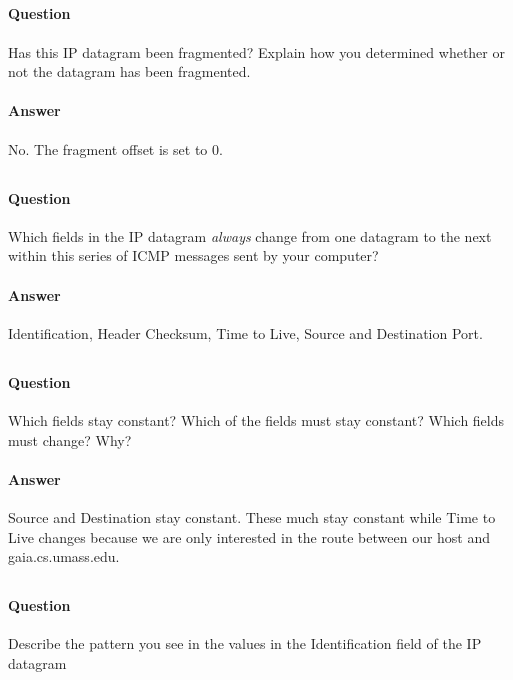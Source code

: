 \documentclass[12pt,letterpaper]{article}
\begin{document}
\subsection{}
\paragraph{Question} Has this IP datagram been fragmented? Explain how you 
determined whether or not the datagram has been fragmented.
\paragraph{Answer} No. The fragment offset is set to 0.

\label{5}
\subsection{}
\paragraph{Question} Which fields in the IP datagram \emph{always} change from
one datagram to the next within this series of ICMP messages sent by your
computer? 
\paragraph{Answer} Identification, Header Checksum, Time to Live, Source and
Destination Port.

\subsection{}
\paragraph{Question} Which fields stay constant? Which of the fields must stay constant? Which fields
must change? Why?
\paragraph{Answer} Source and Destination stay constant. These much stay
constant while Time to Live changes because we are only interested in the route
between our host and gaia.cs.umass.edu.

\label{7}
\subsection{}
\paragraph{Question} Describe the pattern you see in the values in the
Identification field of the IP datagram
\end{document}

